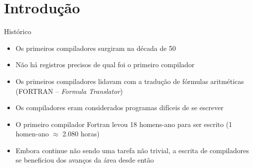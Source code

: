 \section{Introdução}

\begin{frame}[fragile]{Histórico}

    \begin{itemize}
        \item Os primeiros compiladores surgiram na década de 50

        \item Não há registros precisos de qual foi o primeiro compilador

        \item Os primeiros compiladores lidavam com a tradução de fórmulas aritméticas (FORTRAN -- \textit{Formula Translator})

        \item Os compiladores eram considerados programas difíceis de se escrever

        \item O primeiro compilador Fortran levou 18 homens-ano para ser escrito (1 homen-ano $\approx$ 2.080 horas)

        \item Embora continue não sendo uma tarefa não trivial, a escrita de compiladores se beneficiou dos avanços da área desde então
    \end{itemize}

\end{frame}


